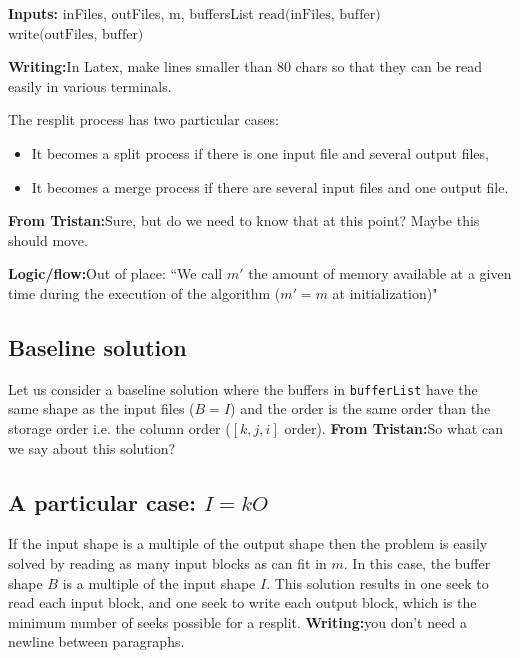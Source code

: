\documentclass[conference]{IEEEtran}
\newcommand{\logic}[1]{\color{red}\textbf{Logic/flow:}#1\color{black}}
\newcommand{\writing}[1]{\color{green}\textbf{Writing:}#1\color{black}}
\newcommand{\tristan}[1]{\color{orange}\textbf{From Tristan:}#1\color{black}}
\begin{document}
\begin{algorithm}[H]
  \caption{General resplit algorithm \tristan{m is unused, the algorithm 
  should be fixed to use it.}}
  \label{algo:generalresplit}
  \begin{algorithmic}
    \STATE \textbf{Inputs:} {inFiles, outFiles, m, buffersList}
      \STATE $\textrm{read(inFiles, buffer)}$
      \STATE $\textrm{write(outFiles, buffer)}$
    \ENDFOR

  \end{algorithmic}
\end{algorithm}

\writing{In Latex, make lines smaller than 80 chars so that they can 
be read easily in various terminals.}

The resplit process has two particular cases:
\begin{itemize}
  \item It becomes a split process if there is one input file and several output files,
  \item It becomes a merge process if there are several input files and one output file.
\end{itemize} 
\tristan{Sure, but do we need to know that at this point? Maybe this should move.}

\logic{Out of place:
``We call $m'$ the amount of memory available at a given time
during the execution of the algorithm ($m'=m$ at initialization)"
}

\subsection{Baseline solution}

Let us consider a baseline solution where the buffers in
\texttt{bufferList} have the same shape as the input files ($B=I$) and the
order is the same order than the storage order i.e. the column order ($[k,
j, i]$ order).
\tristan{So what can we say about this solution? }

\subsection{A particular case: $I=kO$}

If the input shape is a multiple of the output shape then the problem
is easily solved by reading as many input blocks as can fit in $m$. In this case, the buffer
shape $B$ is a multiple of the input shape $I$. This solution results in
one seek to read each input block, and one seek to write each output block, which is
the minimum number of seeks possible for a resplit. \writing{you don't need a newline between paragraphs.}
\end{document}
